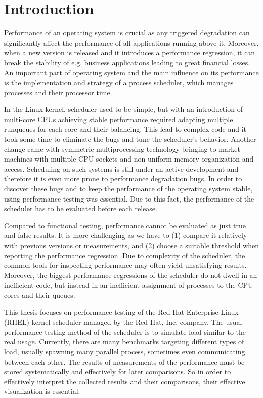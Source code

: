\chapter{Introduction}
Performance of an operating system is crucial as any triggered degradation can
significantly affect the performance of all applications running above it.
Moreover, when a new version is released and it introduces a performance
regression, it can break the stability of e.g. business applications leading to
great financial losses. An important part of operating system and the main
influence on its performance is the implementation and strategy of a process
scheduler, which manages processes and their processor time.

In the Linux kernel, scheduler used to be simple, but with an introduction of
multi-core CPUs achieving stable performance required adapting
multiple runqueues for each core and
their balancing. This lead to complex code and it took some time
to eliminate the bugs and tune the scheduler's behavior. Another change came with
symmetric multiprocessing technology bringing to market machines with multiple
CPU sockets and non-uniform memory organization and access\;\cite{wasted-cores}.
Scheduling on such systems is still under an active development and therefore
it is even more prone to performance degradation bugs. In order to discover these bugs and
to keep the performance of the operating system stable, using performance testing was essential.
Due to this fact, the performance of the scheduler has to be evaluated
before each release.

Compared to functional testing, performance cannot be evaluated as just true and
false results. It is more challenging as we have to (1) compare it relatively with
previous versions or measurements, and (2) choose a suitable threshold when reporting
the performance regression. Due to complexity of the scheduler, the common tools
for inspecting performance may often yield unsatisfying results.
Moreover, the biggest performance regressions of the scheduler do not dwell in an
inefficient code, but instead in an inefficient assignment of processes to the
CPU cores and their queues.

This thesis focuses on performance testing of the Red Hat Enterprise Linux
(RHEL) kernel scheduler managed by the Red Hat, Inc. company.
The usual performance testing method of the scheduler is to simulate load
similar to the real usage. Currently, there are many benchmarks targeting different
types of load, usually spawning many parallel process, sometimes even
communicating between each other. The results of measurements of the performance
must be stored systematically and effectively for later
comparisons. So in order to effectively interpret the collected
results and their comparisons, their effective visualization is essential.

